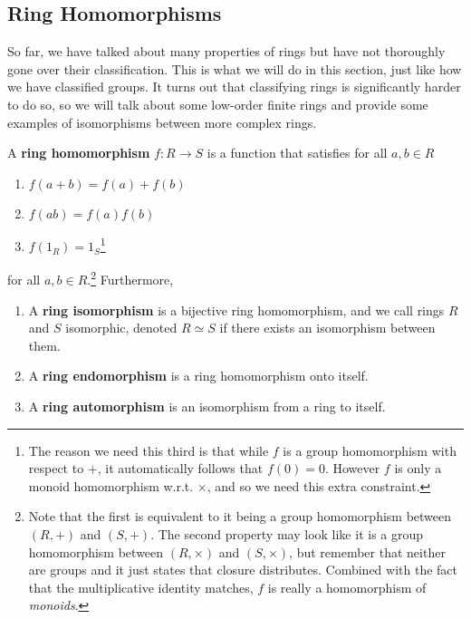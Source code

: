 \subsection{Ring Homomorphisms}

  So far, we have talked about many properties of rings but have not thoroughly gone over their classification. This is what we will do in this section, just like how we have classified groups. It turns out that classifying rings is significantly harder to do so, so we will talk about some low-order finite rings and provide some examples of isomorphisms between more complex rings. 

  \begin{definition}
    A \textbf{ring homomorphism} $f: R \rightarrow S$ is a function that satisfies for all $a, b \in R$
    \begin{enumerate}
      \item $f(a + b) = f(a) + f(b)$
      \item $f(ab) = f(a) f(b)$ 
      \item $f(1_R) = 1_S$\footnote{The reason we need this third is that while $f$ is a group homomorphism with respect to $+$, it automatically follows that $f(0) = 0$. However $f$ is only a monoid homomorphism w.r.t. $\times$, and so we need this extra constraint. }
    \end{enumerate}
    for all $a, b \in R$.\footnote{Note that the first is equivalent to it being a group homomorphism between $(R, +)$ and $(S, +)$. The second property may look like it is a group homomorphism between $(R, \times)$ and $(S, \times)$, but remember that neither are groups and it just states that closure distributes. Combined with the fact that the multiplicative identity matches, $f$ is really a homomorphism of \textit{monoids}. } Furthermore, 
    \begin{enumerate}
      \item A \textbf{ring isomorphism} is a bijective ring homomorphism, and we call rings $R$ and $S$ isomorphic, denoted $R \simeq S$ if there exists an isomorphism between them. 
      \item A \textbf{ring endomorphism} is a ring homomorphism onto itself. 
      \item A \textbf{ring automorphism} is an isomorphism from a ring to itself. 
    \end{enumerate}
  \end{definition} 


